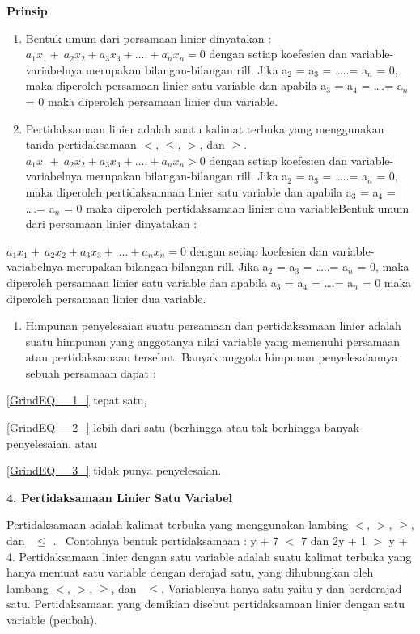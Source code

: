 \documentclass[11pt,fleqn]{book} %
\begin{document}
\noindent \textbf{Prinsip}

\begin{enumerate}
\item \textbf{ }Bentuk umum dari persamaan linier dinyatakan : $a_1x_1+\ a_2x_2+a_3x_3+\dots .+a_nx_n=0$ dengan setiap koefesien dan variable-variabelnya merupakan bilangan-bilangan rill. Jika a${}_{2}$ = a${}_{3}$ = {\dots}..= a${}_{n}$ = 0, maka diperoleh persamaan linier satu variable dan apabila a${}_{3}$ = a${}_{4}$ = {\dots}.= a${}_{n}$ = 0 maka diperoleh persamaan linier dua variable. 

\item  Pertidaksamaan linier adalah suatu  kalimat terbuka yang menggunakan tanda pertidaksamaan $<$, $\mathrm{\le}$, $>$, dan  $\mathrm{\ge}$. $a_1x_1+\ a_2x_2+a_3x_3+\dots .+a_nx_n>0$ dengan setiap koefesien dan variable- variabelnya merupakan bilangan-bilangan rill. Jika a${}_{2}$ = a${}_{3}$ = {\dots}..= a${}_{n}$ = 0, maka diperoleh pertidaksamaan linier satu variable dan apabila a${}_{3}$ = a${}_{4}$ = {\dots}.= a${}_{n}$ = 0 maka diperoleh pertidaksamaan linier dua variableBentuk umum dari persamaan linier dinyatakan : 
\end{enumerate}

\noindent $a_1x_1+\ a_2x_2+a_3x_3+\dots .+a_nx_n=0$ dengan setiap koefesien dan variable-variabelnya merupakan bilangan-bilangan rill. Jika a${}_{2}$ = a${}_{3}$ = {\dots}..= a${}_{n}$ = 0, maka diperoleh persamaan linier satu variable dan apabila a${}_{3}$ = a${}_{4}$ = {\dots}.= a${}_{n}$ = 0 maka diperoleh persamaan linier dua variable.

\begin{enumerate}
\item  Himpunan penyelesaian suatu persamaan dan pertidaksamaan linier adalah suatu himpunan yang anggotanya nilai variable yang memenuhi persamaan atau pertidaksamaan tersebut. Banyak anggota himpunan penyelesaiannya sebuah persamaan dapat :
\end{enumerate}

\noindent  \eqref{GrindEQ__1_} tepat satu,

\noindent  \eqref{GrindEQ__2_} lebih dari satu (berhingga atau tak berhingga banyak penyelesaian, atau

\noindent  \eqref{GrindEQ__3_} tidak punya penyelesaian.

\noindent \textbf{4. Pertidaksamaan Linier Satu Variabel}

\noindent Pertidaksamaan adalah kalimat terbuka yang menggunakan lambing $<$, $>$, $\mathrm{\ge}$, dan~ $\mathrm{\le}$ . ~Contohnya bentuk pertidaksamaan : y + 7 $<$ 7 dan 2y + 1 $>$ y + 4. Pertidaksamaan linier dengan satu variable adalah suatu kalimat terbuka yang hanya memuat satu variable dengan derajad satu, yang dihubungkan oleh lambang $<$, $>$, $\mathrm{\ge}$, dan~ $\mathrm{\le}$. Variablenya hanya satu yaitu y dan berderajad satu. Pertidaksamaan yang demikian disebut pertidaksamaan linier dengan satu variable (peubah).
\end{document}
